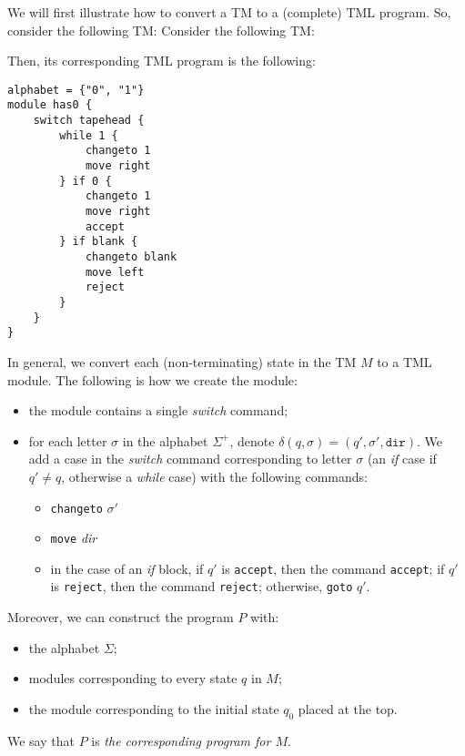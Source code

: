 We will first illustrate how to convert a TM to a (complete) TML program. So, consider the following TM:
Consider the following TM:
\begin{figure}[H]
    \centering
\end{figure}
Then, its corresponding TML program is the following:
\begin{lstlisting}[language=TML]
alphabet = {"0", "1"}
module has0 {
    switch tapehead {
        while 1 {
            changeto 1
            move right
        } if 0 {
            changeto 1
            move right
            accept
        } if blank {
            changeto blank
            move left
            reject
        }
    }
}
\end{lstlisting}
In general, we convert each (non-terminating) state in the TM $M$ to a TML module. The following is how we create the module:
\begin{itemize}
    \item the module contains a single \textit{switch} command;
    \item for each letter $\sigma$ in the alphabet $\Sigma^+$, denote $\delta(q, \sigma) = (q', \sigma', \texttt{dir})$. We add a case in the \textit{switch} command corresponding to letter $\sigma$ (an \textit{if} case if $q' \neq q$, otherwise a \textit{while} case) with the following commands:
    \begin{itemize}
        \item \texttt{changeto} $\sigma'$
        \item \texttt{move} \textit{dir}
        \item in the case of an \textit{if} block, if $q'$ is \texttt{accept}, then the command \texttt{accept}; if $q'$ is \texttt{reject}, then the command \texttt{reject}; otherwise, \texttt{goto} $q'$.
    \end{itemize}
\end{itemize}
Moreover, we can construct the program $P$ with:
\begin{itemize}
    \item the alphabet $\Sigma$;
    \item modules corresponding to every state $q$ in $M$;
    \item the module corresponding to the initial state $q_0$ placed at the top.
\end{itemize}
We say that $P$ is \emph{the corresponding program for $M$}.

